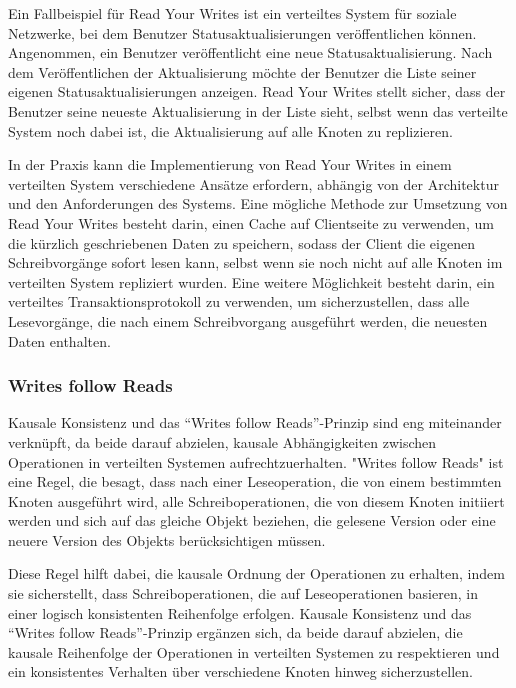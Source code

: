 Ein Fallbeispiel für Read Your Writes ist ein verteiltes System für soziale Netzwerke, bei dem Benutzer Statusaktualisierungen veröffentlichen können. Angenommen, ein Benutzer veröffentlicht eine neue Statusaktualisierung. Nach dem Veröffentlichen der Aktualisierung möchte der Benutzer die Liste seiner eigenen Statusaktualisierungen anzeigen. Read Your Writes stellt sicher, dass der Benutzer seine neueste Aktualisierung in der Liste sieht, selbst wenn das verteilte System noch dabei ist, die Aktualisierung auf alle Knoten zu replizieren.

In der Praxis kann die Implementierung von Read Your Writes in einem verteilten System verschiedene Ansätze erfordern, abhängig von der Architektur und den Anforderungen des Systems. Eine mögliche Methode zur Umsetzung von Read Your Writes besteht darin, einen Cache auf Clientseite zu verwenden, um die kürzlich geschriebenen Daten zu speichern, sodass der Client die eigenen Schreibvorgänge sofort lesen kann, selbst wenn sie noch nicht auf alle Knoten im verteilten System repliziert wurden. Eine weitere Möglichkeit besteht darin, ein verteiltes Transaktionsprotokoll zu verwenden, um sicherzustellen, dass alle Lesevorgänge, die nach einem Schreibvorgang ausgeführt werden, die neuesten Daten enthalten.

\subsubsection{Writes follow Reads}
Kausale Konsistenz und das \enquote{Writes follow Reads}-Prinzip sind eng miteinander verknüpft, da beide darauf abzielen, kausale Abhängigkeiten zwischen Operationen in verteilten Systemen aufrechtzuerhalten. "Writes follow Reads" ist eine Regel, die besagt, dass nach einer Leseoperation, die von einem bestimmten Knoten ausgeführt wird, alle Schreiboperationen, die von diesem Knoten initiiert werden und sich auf das gleiche Objekt beziehen, die gelesene Version oder eine neuere Version des Objekts berücksichtigen müssen.

Diese Regel hilft dabei, die kausale Ordnung der Operationen zu erhalten, indem sie sicherstellt, dass Schreiboperationen, die auf Leseoperationen basieren, in einer logisch konsistenten Reihenfolge erfolgen. Kausale Konsistenz und das \enquote{Writes follow Reads}-Prinzip ergänzen sich, da beide darauf abzielen, die kausale Reihenfolge der Operationen in verteilten Systemen zu respektieren und ein konsistentes Verhalten über verschiedene Knoten hinweg sicherzustellen.

